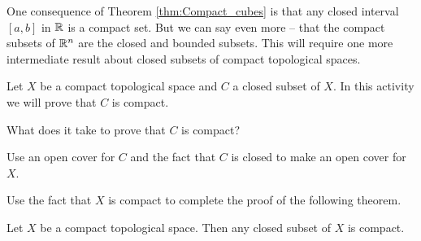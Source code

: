 One consequence of Theorem \ref{thm:Compact_cubes} is that any closed interval $[a,b]$ in $\mathbb{R}$ is a compact set. But we can say even more -- that the compact subsets of $\mathbb{R}^n$ are the closed and bounded subsets. This will require one more intermediate result about closed subsets of compact topological spaces. 


\begin{activity} Let $X$ be a compact topological space and $C$ a closed subset of $X$. In this activity we will prove that $C$ is compact. 
\ba
\item What does it take to prove that $C$ is compact? 

\item Use an open cover for $C$ and the fact that $C$ is closed to make an open cover for $X$.

\item Use the fact that $X$ is compact to complete the proof of the following theorem.

\begin{theorem} \label{thm:closed_compact} Let $X$ be a compact topological space. Then any closed subset of $X$ is compact. 
\end{theorem}

\ea

\end{activity}

\begin{comment}

\ActivitySolution

\ba
\item We need to show that every open cover of $C$ has a finite subcover. 

\item Let $\{O_{\alpha}\}$ be an open cover of $C$ for $\alpha$ in some indexing set $I$. Since $C$ is closed, the set $X \setminus C$ is an open set. Then $\{O_{\alpha}\} \cup (X \setminus C)$ is an open cover of $X$.

\item Since $X$ is compact, this open cover has a finite sub-cover. In other words, there are sets $O_{\alpha_1}$, $O_{\alpha_2}$, $\ldots$, $O_{\alpha_n}$ for some positive integer $n$ such that $\alpha_i \in I$ for each $i$ and 
\[X \subseteq O_{\alpha_1} \cup O_{\alpha_2} \cup \cdots \cup O_{\alpha_n} \cup (X \setminus C).\]
But then we must have
\[C \subseteq O_{\alpha_1} \cup O_{\alpha_2} \cup \cdots \cup O_{\alpha_n}\]
and we have found a finite sub-cover of the open cover $\{O_{\alpha}\}$. We conclude that $C$ is compact.

\ea

\end{comment}

